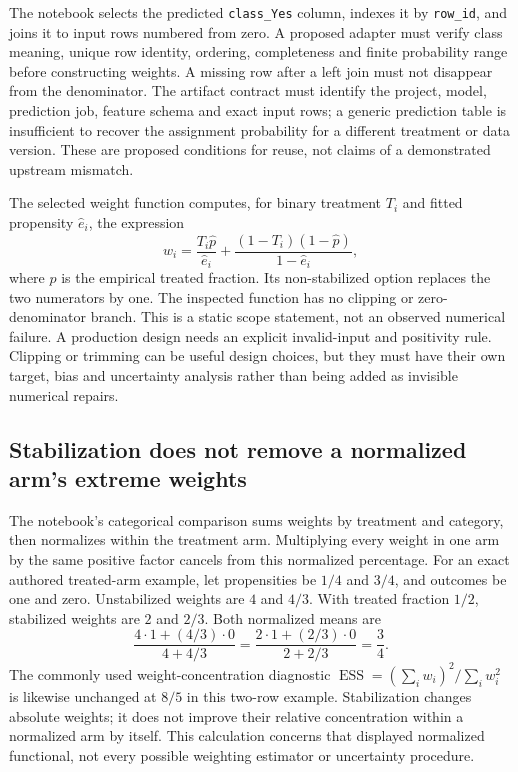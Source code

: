 The notebook selects the predicted \texttt{class\_Yes} column, indexes it by
\texttt{row\_id}, and joins it to input rows numbered from zero. A proposed
adapter must verify class meaning, unique row identity, ordering, completeness
and finite probability range before constructing weights. A missing row after
a left join must not disappear from the denominator. The artifact contract
must identify the project, model, prediction job, feature schema and exact
input rows; a generic prediction table is insufficient to recover the
assignment probability for a different treatment or data version. These are
proposed conditions for reuse, not claims of a demonstrated upstream mismatch.
\citep{exec25_datarobot_notebook,exec25_datarobot_choice}

The selected weight function computes, for binary treatment $T_i$ and fitted
propensity $\widehat e_i$, the expression
\begin{equation}
 w_i=\frac{T_i\widehat p}{\widehat e_i}
       +\frac{(1-T_i)(1-\widehat p)}{1-\widehat e_i},
\end{equation}
where $\widehat p$ is the empirical treated fraction. Its non-stabilized option
replaces the two numerators by one. The inspected function has no clipping or
zero-denominator branch. This is a static scope statement, not an observed
numerical failure. A production design needs an explicit invalid-input and
positivity rule. Clipping or trimming can be useful design choices, but they
must have their own target, bias and uncertainty analysis rather than being
added as invisible numerical repairs.\citep{exec25_datarobot_notebook,exec25_datarobot_choice}

\subsection{Stabilization does not remove a normalized arm's extreme weights}
The notebook's categorical comparison sums weights by treatment and category,
then normalizes within the treatment arm. Multiplying every weight in one arm
by the same positive factor cancels from this normalized percentage. For an
exact authored treated-arm example, let propensities be $1/4$ and $3/4$, and
outcomes be one and zero. Unstabilized weights are $4$ and $4/3$. With treated
fraction $1/2$, stabilized weights are $2$ and $2/3$. Both normalized means are
\begin{equation}
 \frac{4\cdot1+(4/3)\cdot0}{4+4/3}
 =\frac{2\cdot1+(2/3)\cdot0}{2+2/3}=\frac34.
\end{equation}
The commonly used weight-concentration diagnostic
$\operatorname{ESS}=(\sum_i w_i)^2/\sum_i w_i^2$ is likewise unchanged at
$8/5$ in this two-row example. Stabilization changes absolute weights; it does
not improve their relative concentration within a normalized arm by itself.
This calculation concerns that displayed normalized functional, not every
possible weighting estimator or uncertainty procedure.\citep{exec25_datarobot_notebook,exec25_datarobot_choice}

